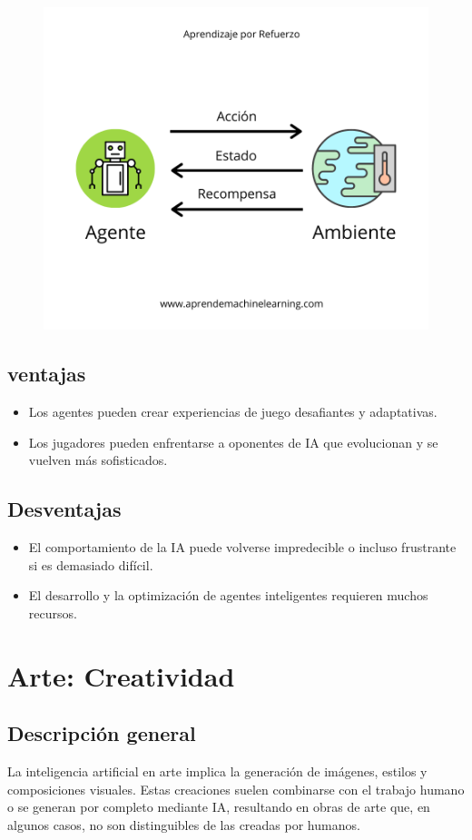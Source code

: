 \documentclass[12pt]{article}
\begin{document}
\begin{figure}[h!]
    \centering
    \includegraphics[width=.6\textwidth]{AprendizajeRefuerzo-global.png}
    \label{fig:my_label}
\end{figure}

\subsection{ventajas}
\begin{itemize}
    \item Los agentes pueden crear experiencias de juego desafiantes y adaptativas.
    \item Los jugadores pueden enfrentarse a oponentes de IA que evolucionan y se vuelven más sofisticados.
\end{itemize}

\subsection{Desventajas}
\begin{itemize}
    \item El comportamiento de la IA puede volverse impredecible o incluso frustrante si es demasiado difícil.
    \item El desarrollo y la optimización de agentes inteligentes requieren muchos recursos.
\end{itemize}

\section{Arte: Creatividad}
\subsection{Descripción general}

La inteligencia artificial en arte implica la generación de imágenes, estilos y composiciones visuales. Estas creaciones suelen 
combinarse con el trabajo humano o se generan por completo mediante IA, resultando en obras de arte que, en algunos casos, no son 
distinguibles de las creadas por humanos.
\end{document}
